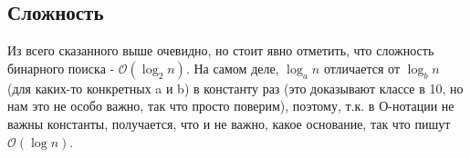 \documentclass[12pt]{article} %
\def\O{\mathcal{O}}
\begin{document}
\subsection{Сложность}
Из всего сказанного выше очевидно, но стоит явно отметить, что сложность бинарного поиска - $\O(\log_2 n)$. На самом деле, $\log_an$ отличается от $\log_bn$ (для каких-то конкретных a и b) в константу раз (это доказывают классе в 10, но нам это не особо важно, так что просто поверим), поэтому, т.к. в О-нотации не важны константы, получается, что и не важно, какое основание, так что пишут $\O(\log n)$.
\end{document}
